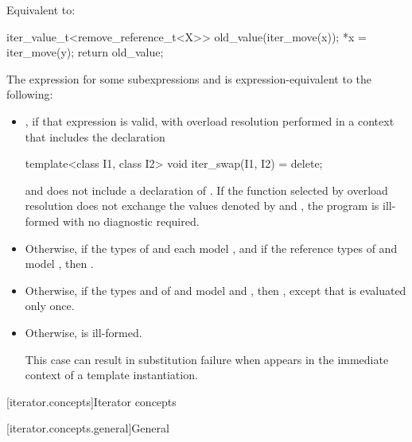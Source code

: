 \begin{itemdescr}
\pnum
\effects Equivalent to:
\begin{codeblock}
iter_value_t<remove_reference_t<X>> old_value(iter_move(x));
*x = iter_move(y);
return old_value;
\end{codeblock}
\end{itemdescr}

\pnum
The expression  for some subexpressions
 and  is expression-equivalent to the following:

\begin{itemize}
\item {}, if that expression is valid,
with overload resolution performed in a context that includes the declaration
\begin{codeblock}
template<class I1, class I2>
  void iter_swap(I1, I2) = delete;
\end{codeblock}
and does not include a declaration of .
If the function selected by overload resolution does not exchange the values
denoted by  and , the program is
ill-formed with no diagnostic required.

\item Otherwise, if the types of  and  each model
, and if the reference types of  and 
model ,
then .

\item Otherwise, if the types  and  of  and
 model  and
, then
,
except that  is evaluated only once.

\item Otherwise,  is ill-formed.
\begin{note}
This case can result in substitution failure when 
appears in the immediate context of a template instantiation.
\end{note}
\end{itemize}

[iterator.concepts]{Iterator concepts}

[iterator.concepts.general]{General}

